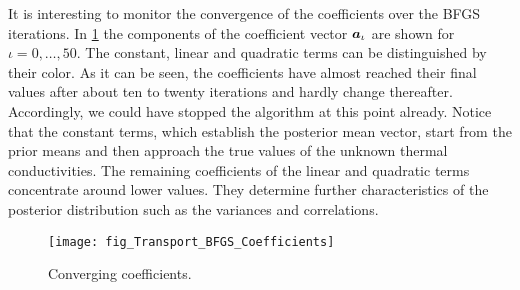 \begin{table}[htbp]
  \caption[BFGS optimization]{BFGS optimization.}
  \label{tab:Transport:BFGS:Convergence}
  \centering
\end{table}
\par %
It is interesting to monitor the convergence of the coefficients over the BFGS iterations.
In \cref{fig:Transport:BFGS:Coefficients} the components of the coefficient vector \(\bm{a}_\iota\) are shown for \(\iota = 0,\ldots,50\).
The constant, linear and quadratic terms can be distinguished by their color.
As it can be seen, the coefficients have almost reached their final values after about ten to twenty iterations and hardly change thereafter.
Accordingly, we could have stopped the algorithm at this point already.
Notice that the constant terms, which establish the posterior mean vector, start from the prior means and then approach the true values of the unknown thermal conductivities.
The remaining coefficients of the linear and quadratic terms concentrate around lower values.
They determine further characteristics of the posterior distribution such as the variances and correlations.
\begin{figure}[htbp]
  \centering
  \texttt{[image: fig\_Transport\_BFGS\_Coefficients]}
  \caption[Converging coefficients]{Converging coefficients.}
  \label{fig:Transport:BFGS:Coefficients}
\end{figure}
\par %
